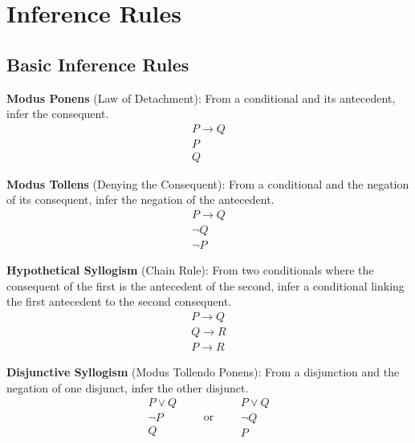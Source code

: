
\section{Inference Rules}

\subsection{Basic Inference Rules}

\begin{definition}
\textbf{Modus Ponens} (Law of Detachment): From a conditional and its antecedent,
infer the consequent.
\[
\begin{array}{l}
P \rightarrow Q \\
P \\ \hline
Q
\end{array}
\]
\end{definition}

\begin{definition}
\textbf{Modus Tollens} (Denying the Consequent): From a conditional and the
negation of its consequent, infer the negation of the antecedent.
\[
\begin{array}{l}
P \rightarrow Q \\
\neg Q \\ \hline
\neg P
\end{array}
\]
\end{definition}

\begin{definition}
\textbf{Hypothetical Syllogism} (Chain Rule): From two conditionals where the
consequent of the first is the antecedent of the second, infer a conditional
linking the first antecedent to the second consequent.
\[
\begin{array}{l}
P \rightarrow Q \\
Q \rightarrow R \\ \hline
P \rightarrow R
\end{array}
\]
\end{definition}

\begin{definition}
\textbf{Disjunctive Syllogism} (Modus Tollendo Ponens): From a disjunction and the
negation of one disjunct, infer the other disjunct.
\[
\begin{array}{l}
P \vee Q \\
\neg P \\ \hline
Q
\end{array}
\qquad\text{or}\qquad
\begin{array}{l}
P \vee Q \\
\neg Q \\ \hline
P
\end{array}
\]
\end{definition}

